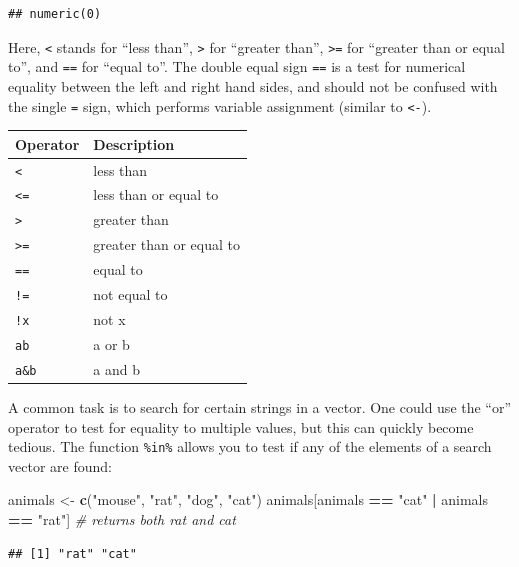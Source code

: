 \documentclass[]{book}
\newenvironment{Shaded}{\begin{snugshade}}{\end{snugshade}}
\newcommand{\CommentTok}[1]{\textcolor[rgb]{0.56,0.35,0.01}{\textit{#1}}}
\newcommand{\KeywordTok}[1]{\textcolor[rgb]{0.13,0.29,0.53}{\textbf{#1}}}
\newcommand{\NormalTok}[1]{#1}
\newcommand{\OperatorTok}[1]{\textcolor[rgb]{0.81,0.36,0.00}{\textbf{#1}}}
\newcommand{\StringTok}[1]{\textcolor[rgb]{0.31,0.60,0.02}{#1}}
\begin{document}
\begin{verbatim}
## numeric(0)
\end{verbatim}

Here, \texttt{\textless{}} stands for ``less than'', \texttt{\textgreater{}} for ``greater than'', \texttt{\textgreater{}=} for ``greater than or equal to'', and \texttt{==} for ``equal to''. The double equal sign \texttt{==} is a test for numerical equality between the left and right hand sides, and should not be confused with the single \texttt{=} sign, which performs variable assignment (similar to \texttt{\textless{}-}).

\begin{longtable}[]{@{}ll@{}}
\toprule
Operator & Description\tabularnewline
\midrule
\endhead
\texttt{\textless{}} & less than\tabularnewline
\texttt{\textless{}=} & less than or equal to\tabularnewline
\texttt{\textgreater{}} & greater than\tabularnewline
\texttt{\textgreater{}=} & greater than or equal to\tabularnewline
\texttt{==} & equal to\tabularnewline
\texttt{!=} & not equal to\tabularnewline
\texttt{!x} & not x\tabularnewline
\texttt{a\textbar{}b} & a or b\tabularnewline
\texttt{a\&b} & a and b\tabularnewline
\bottomrule
\end{longtable}

A common task is to search for certain strings in a vector. One could use the ``or'' operator \textbar{} to test for equality to multiple values, but this can quickly become tedious. The function \texttt{\%in\%} allows you to test if any of the elements of a search vector are found:

\begin{Shaded}
\begin{Highlighting}[]
\NormalTok{animals <-}\StringTok{ }\KeywordTok{c}\NormalTok{(}\StringTok{"mouse"}\NormalTok{, }\StringTok{"rat"}\NormalTok{, }\StringTok{"dog"}\NormalTok{, }\StringTok{"cat"}\NormalTok{)}
\NormalTok{animals[animals }\OperatorTok{==}\StringTok{ "cat"} \OperatorTok{|}\StringTok{ }\NormalTok{animals }\OperatorTok{==}\StringTok{ "rat"}\NormalTok{] }\CommentTok{# returns both rat and cat}
\end{Highlighting}
\end{Shaded}

\begin{verbatim}
## [1] "rat" "cat"
\end{verbatim}

\begin{Shaded}
\end{Shaded}
\end{document}
